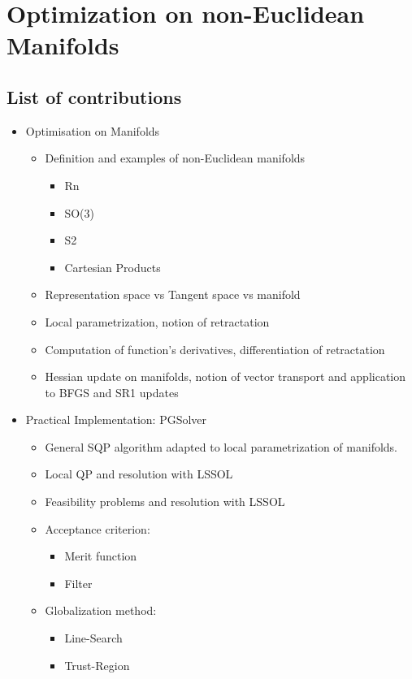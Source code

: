 \chapter{
Optimization on non-Euclidean Manifolds
}
\section{List of contributions}
\begin{itemize}
  \item{Optimisation on Manifolds}
    \begin{itemize}
      \item Definition and examples of non-Euclidean manifolds
        \begin{itemize}
          \item Rn
          \item SO(3)
          \item S2
          \item Cartesian Products
        \end{itemize}
      \item Representation space vs Tangent space vs manifold
      \item Local parametrization, notion of retractation
      \item Computation of function's derivatives, differentiation of retractation
      \item Hessian update on manifolds, notion of vector transport and application to BFGS and SR1 updates
    \end{itemize}
  \item{Practical Implementation: PGSolver}
    \begin{itemize}
      \item General SQP algorithm adapted to local parametrization of manifolds.
      \item Local QP and resolution with LSSOL
      \item Feasibility problems and resolution with LSSOL
      \item Acceptance criterion:
        \begin{itemize}
          \item Merit function
          \item Filter
        \end{itemize}
      \item Globalization method:
        \begin{itemize}
          \item Line-Search
          \item Trust-Region

\end{itemize}
\end{itemize}
\end{itemize}
